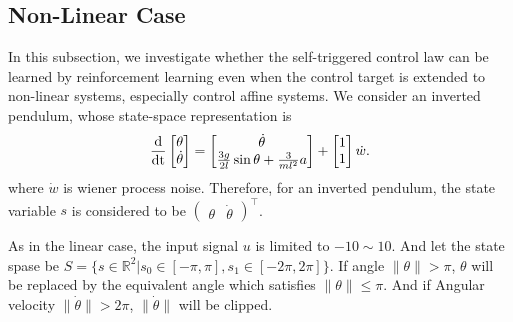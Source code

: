 \documentclass[english, dvipdfmx]{ampmt}             %
\newcommand{\odif}[2]{\frac{\rm{d}#1}{\rm{d}#2}}
\begin{document}
\subsection{Non-Linear Case}
In this subsection, we investigate whether the self-triggered control law can be learned by reinforcement learning even when the control target is extended to non-linear systems, especially control affine systems. We consider an inverted pendulum, whose state-space representation is
\begin{equation}
	\odif{}{t}\begin{bmatrix}\theta \\ \dot{\theta}\end{bmatrix} = 
		\begin{bmatrix}\dot{\theta} \\ \frac{3g}{2l}\sin{\theta} + \frac{3}{ml^2}a \end{bmatrix} + \begin{bmatrix}1 \\ 1\end{bmatrix}\dot{w}\label{pendulum}.
\end{equation}
where $\dot{w}$ is wiener process noise. Therefore, for an inverted pendulum, the state variable $s$ is considered to be $\begin{pmatrix}\theta & \dot{\theta}\end{pmatrix}^{\top}$.
\par
As in the linear case, the input signal $u$ is limited to $-10 \sim 10$. And let the state spase be $S = \{s\in \mathbb{R}^2| s_0\in[-\pi,\pi], s_1\in[-2\pi,2\pi]\}$. If angle $\|\theta\| > \pi$, $\theta$ will be  replaced by the equivalent angle which satisfies $\|\theta\| \leq \pi$. And if Angular velocity $\|\dot{\theta}\| > 2\pi$, $\|\dot{\theta}\|$ will be clipped.
\end{document}
